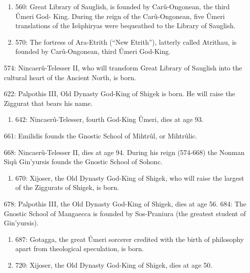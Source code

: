 \documentclass[]{book}
\providecommand{\tightlist}{%
  \setlength{\itemsep}{0pt}\setlength{\parskip}{0pt}}
\begin{document}
\begin{enumerate}
\def\labelenumi{\alph{enumi}.}
\setcounter{enumi}{2}
\item
  560: Great Library of Sauglish, is founded by Carû-Ongonean, the third Ûmeri God-
  King. During the reign of the Carû-Ongonean, five Ûmeri translations of
  the Isûphiryas were bequeathed to the Library of Sauglish.
\item
  570: The fortress of Ara-Etrith (``New Etrith''), latterly called Atrithau, is founded
  by Carû-Ongonean, third Ûmeri God-King.
\end{enumerate}

574: Nincaerû-Telesser II, who will transform Great Library of Sauglish into the
cultural heart of the Ancient North, is born.

622: Palpothis III, Old Dynasty God-King of Shigek is born. He will raise
the Ziggurat that bears his name.

\begin{enumerate}
\def\labelenumi{\alph{enumi}.}
\setcounter{enumi}{2}
\tightlist
\item
  642: Nincaerû-Telesser, fourth God-King Ûmeri, dies at age 93.
\end{enumerate}

661: Emilidis founds the Gnostic School of Mihtrûl, or Mihtrûlic.

668: Nincaerû-Telesser II, dies at age 94. During his reign (574-668) the Nonman
Siqû Gin'yursis founds the Gnostic School of Sohonc.

\begin{enumerate}
\def\labelenumi{\alph{enumi}.}
\setcounter{enumi}{2}
\tightlist
\item
  670: Xijoser, the Old Dynasty God-King of Shigek, who will raise the largest of
  the Ziggurats of Shigek, is born.
\end{enumerate}

678: Palpothis III, the Old Dynasty God-King of Shigek, dies at age 56.
684: The Gnostic School of Mangaecca is founded by Sos-Praniura (the greatest
student of Gin'yursis).

\begin{enumerate}
\def\labelenumi{\alph{enumi}.}
\setcounter{enumi}{2}
\item
  687: Gotagga, the great Ûmeri sorcerer credited with the birth of philosophy apart
  from theological speculation, is born.
\item
  720: Xijoser, the Old Dynasty God-King of Shigek, dies at age 50.
\end{enumerate}
\end{document}
